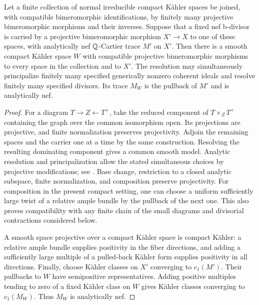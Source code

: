 \begin{lemma}\label{lem:common-projective-models}
Let a finite collection of normal irreducible compact K\"ahler spaces
be joined, with compatible bimeromorphic identifications, by finitely
many projective bimeromorphic morphisms and their inverses.  Suppose
that a fixed nef b-divisor is carried by a projective bimeromorphic
morphism $X'\to X$ to one of these spaces, with analytically nef
$\mathbb{Q}$-Cartier trace $M'$ on $X'$.  Then there is a
smooth compact K\"ahler space $W$ with compatible projective
bimeromorphic morphisms to every space in the collection and to $X'$.
The resolution may simultaneously principalize finitely many specified
generically nonzero coherent ideals and resolve finitely many specified divisors.  Its trace
$M_W$ is the pullback of $M'$ and is analytically nef.
\end{lemma}

\begin{proof}
For a diagram $T\to Z\leftarrow T^+$, take the reduced component of
$T\times_ZT^+$ containing the graph over the common isomorphism open.
Its projections are projective, and finite normalization preserves
projectivity.  Adjoin the remaining spaces and the carrier one at a
time by the same construction.  Resolving the resulting dominating
component gives a common smooth model.  Analytic resolution and
principalization allow the stated simultaneous choices by projective
modifications; see \cite[Theorems~1.6, 1.10 and 13.2(1)]{BierstoneMilman1997}.
Base change, restriction to a closed analytic subspace, finite
normalization, and composition preserve projectivity.  For composition
in the present compact setting, one can choose a uniform sufficiently
large twist of a relative ample bundle by the pullback of the next one.
This also proves compatibility with any finite chain of the small
diagrams and divisorial contractions considered below.

A smooth space projective over a compact K\"ahler space is compact
K\"ahler: a relative ample bundle supplies positivity in the fiber
directions, and adding a sufficiently large multiple of a pulled-back
K\"ahler form supplies positivity in all directions.  Finally, choose
K\"ahler classes on $X'$ converging to $c_1(M')$.  Their pullbacks to
$W$ have semipositive representatives.  Adding positive multiples
tending to zero of a fixed K\"ahler class on $W$ gives K\"ahler classes
converging to $c_1(M_W)$.  Thus $M_W$ is analytically nef.
\end{proof}

